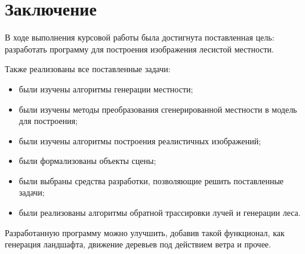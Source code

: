 \chapter*{Заключение}

В ходе выполнения курсовой работы была достигнута поставленная цель: разработать программу для построения изображения лесистой местности.

Также реализованы все поставленные задачи:

\begin{itemize}
	\item были изучены алгоритмы генерации местности;
	\item были изучены методы преобразования сгенерированной местности в модель для построения;
	\item были изучены алгоритмы построения реалистичных изображений;
	\item были формализованы объекты сцены;
	\item были выбраны средства разработки, позволяющие решить поставленные задачи;
	\item были реализованы алгоритмы обратной трассировки лучей и генерации леса.
\end{itemize}

Разработанную программу можно улучшить, добавив такой функционал, как генерация ландшафта, движение деревьев под действием ветра и прочее.

\newpage